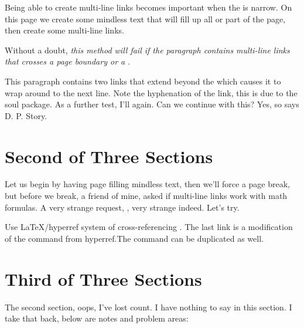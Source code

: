 \documentclass{article}
\begin{document}
\begin{multicols}{2}
\noindent Being able to create multi-line links becomes important when the
\texttt{\string\linewidth} is narrow. On this page we create some
mindless text that will fill up all or part of the page, then create
some multi-line links.

Without a doubt, \textsl{this method will fail if the paragraph contains
multi-line links that crosses a \emph{page boundary} or a \emph{}}.

This paragraph contains two links that extend beyond the
 which causes it to wrap around to the next line. Note the
hyphenation of the link, this is due to the \textsf{soul} package.
As a further test, I'll  again. Can we continue with
this? Yes, so says D. P. Story.

\end{multicols}


\section{Second of Three Sections}\label{second}

Let us begin by having page filling mindless text,
then we'll force a page break, but before we break, a friend of
mine, asked if multi-line links work with math formulas. A very strange request,
, very strange
indeed. Let's try.

Use \LaTeX/hyperref system of cross-referencing
. The last link is a modification of
the \texttt{\string\nameref} command from hyperref.The
\texttt{\string\Nameref} command can be duplicated
 as well.

\newpage

\section{Third of Three Sections}\label{three}

The second section, oops, I've lost count. I have nothing to say in
this section. I take that back, below are notes and problem areas:
\end{document}

